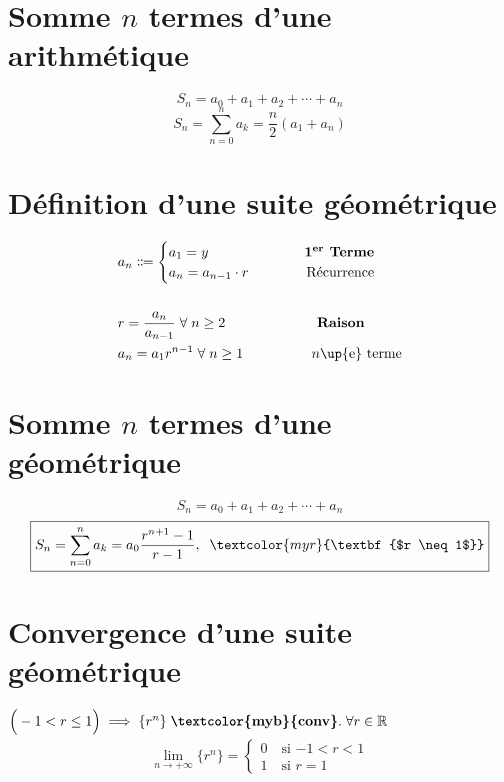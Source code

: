 \documentclass{report}
\begin{document}
\begin{multicols*}{3}
    \section{Somme $n$ termes d'une arithmétique}
    \vspace{-2em}
        \[%
        S_n = a_0 + a_1 + a_2 + \cdots + a_n 
        \]%
        \vspace{-1em}
    \[%
        \boxed{S_n = \sum_{n=0}^{n }a_k = \dfrac{n}{2}(a_1 + a_n)}
    \]%



    \section{Définition d'une suite géométrique}
        \begin{align*}
                &a_n \Coloneqq 
                \begin{cases}
                    a_1 = y  &\omit\quad\quad\quad \textbf{1\textsuperscript{er} Terme} \\  a_{n} = a_{n-1} \cdot r &\omit\hfill \quad\quad Récurrence \end{cases} \\\\ &r = \frac{a_n}{a_{n-1}} \; \forall \; n \geq 2 \quad\quad\quad\quad\quad\quad\;\; \textbf{Raison} \\ &a_n = a_1r^{n - 1} \; \forall \; n \geq 1 \text{\quad\quad\quad\quad\;\; $n$\up{e} terme} \end{align*} 

        \section{Somme $n$ termes d'une géométrique}
        \vspace{-2em}
        \[%
        S_n = a_0 + a_1 + a_2 + \cdots + a_n 
        \]%
    \[%
        \boxed{S_n = \sum_{n=0}^{n }a_k = a_0\dfrac{r^{n+1} - 1}{r - 1}, 
            \;\; \textcolor{myr}{\textbf{$r \neq 1$}}}    
        \]%

        \section{Convergence d'une suite géométrique}
        \noindent       
        $\Big( -1 < r \leq 1 \Big) \implies \{r^n\} \; 
        \textbf{\textcolor{myb}{conv}}. \; 
        \forall r \in \mathbb{R}$
        \begin{align*}
            \lim\limits_{n\to+\infty }\{r^n\} = 
                    \begin{cases}
                        0 \quad \text{si $-1 < r < 1$} \\
                        1 \quad \text{si $r = 1$}
                    \end{cases}
        \end{align*}



\end{multicols*}
\end{document}
